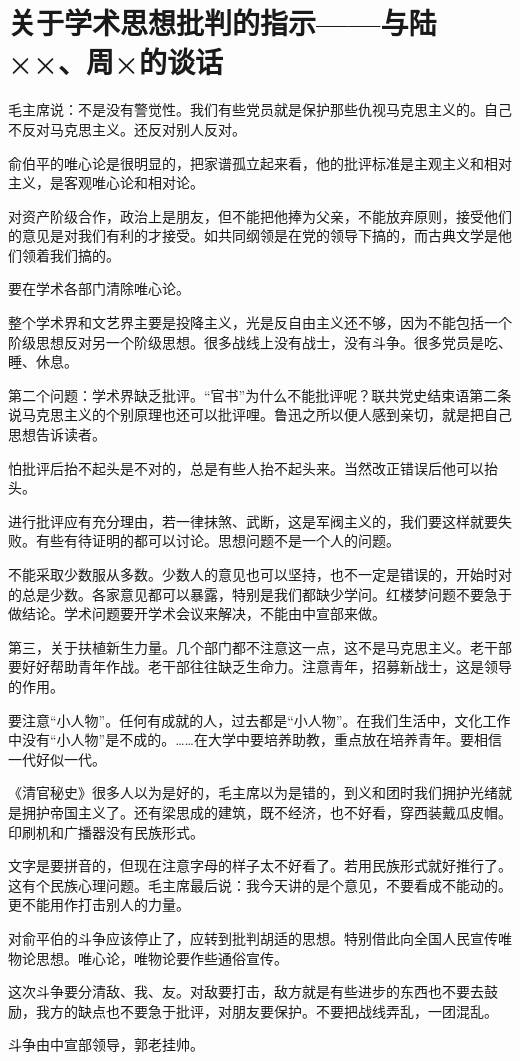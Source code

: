 \section[关于学术思想批判的指示——与陆××、周×的谈话（一九五四年）]{关于学术思想批判的指示——与陆××、周×的谈话}


毛主席说：不是没有警觉性。我们有些党员就是保护那些仇视马克思主义的。自己不反对马克思主义。还反对别人反对。

俞伯平的唯心论是很明显的，把家谱孤立起来看，他的批评标准是主观主义和相对主义，是客观唯心论和相对论。

对资产阶级合作，政治上是朋友，但不能把他捧为父亲，不能放弃原则，接受他们的意见是对我们有利的才接受。如共同纲领是在党的领导下搞的，而古典文学是他们领着我们搞的。

要在学术各部门清除唯心论。

整个学术界和文艺界主要是投降主义，光是反自由主义还不够，因为不能包括一个阶级思想反对另一个阶级思想。很多战线上没有战士，没有斗争。很多党员是吃、睡、休息。

第二个问题：学术界缺乏批评。“官书”为什么不能批评呢？联共党史结束语第二条说马克思主义的个别原理也还可以批评哩。鲁迅之所以便人感到亲切，就是把自己思想告诉读者。

怕批评后抬不起头是不对的，总是有些人抬不起头来。当然改正错误后他可以抬头。

进行批评应有充分理由，若一律抹煞、武断，这是军阀主义的，我们要这样就要失败。有些有待证明的都可以讨论。思想问题不是一个人的问题。

不能采取少数服从多数。少数人的意见也可以坚持，也不一定是错误的，开始时对的总是少数。各家意见都可以暴露，特别是我们都缺少学问。红楼梦问题不要急于做结论。学术问题要开学术会议来解决，不能由中宣部来做。

第三，关于扶植新生力量。几个部门都不注意这一点，这不是马克思主义。老干部要好好帮助青年作战。老干部往往缺乏生命力。注意青年，招募新战士，这是领导的作用。

要注意“小人物”。任何有成就的人，过去都是“小人物”。在我们生活中，文化工作中没有“小人物”是不成的。……在大学中要培养助教，重点放在培养青年。要相信一代好似一代。

《清官秘史》很多人以为是好的，毛主席以为是错的，到义和团时我们拥护光绪就是拥护帝国主义了。还有梁思成的建筑，既不经济，也不好看，穿西装戴瓜皮帽。印刷机和广播器没有民族形式。

文字是要拼音的，但现在注意字母的样子太不好看了。若用民族形式就好推行了。这有个民族心理问题。毛主席最后说：我今天讲的是个意见，不要看成不能动的。更不能用作打击别人的力量。

对俞平伯的斗争应该停止了，应转到批判胡适的思想。特别借此向全国人民宣传唯物论思想。唯心论，唯物论要作些通俗宣传。

这次斗争要分清敌、我、友。对敌要打击，敌方就是有些进步的东西也不要去鼓励，我方的缺点也不要急于批评，对朋友要保护。不要把战线弄乱，一团混乱。

斗争由中宣部领导，郭老挂帅。


